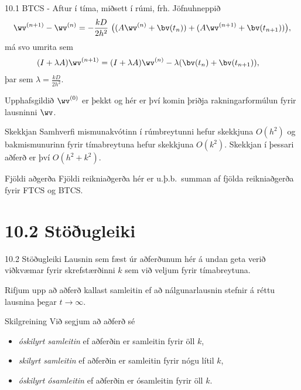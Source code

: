\begin{frame}{10.1 BTCS - Aftur í tíma, miðsett í rúmi, frh.}
 Jöfnuhneppið
 $$ 
 \wv^{(n+1)} - \wv^{(n)} =  -\frac{kD}{2h^2}\  
 \big( (A\wv^{(n)} + \bv(t_{n})) +  
 (A\wv^{(n+1)} + \bv(t_{n+1})) \big), 
$$
má svo umrita sem
\begin{align*}
 (I+\lambda A)\wv^{(n+1)} &= (I+\lambda A) \wv^{(n)}  - \lambda (\bv(t_{n}) 
 + \bv(t_{n+1})), 
\end{align*}
þar sem $\lambda = \frac{kD}{2h^2}$. \pause
 
 Upphafsgildið $\wv^{(0)}$ er þekkt og hér er því komin þriðja rakningarformúlun
 fyrir lausninni $\wv$.  \pause
 
 \begin{block}{Skekkjan}
  Samhverfi mismunakvótinn í rúmbreytunni hefur skekkjuna
 $O(h^2)$ og bakmismunurinn fyrir tímabreytuna hefur skekkjuna $O(k^2)$. 
 Skekkjan í þessari aðferð er því $O(h^2 + k^2)$.
 \end{block}
 
 \begin{block}{Fjöldi aðgerða}
  Fjöldi reikniaðgerða hér er u.þ.b.~summan af fjölda reikniaðgerða fyrir FTCS og BTCS.
 \end{block}

 
 \end{frame}
 
 \section*{10.2 Stöðugleiki}
 
 \begin{frame}{10.2 Stöðugleiki}
  Lausnin sem fæst úr aðferðunum hér á undan geta verið viðkvæmar fyrir skrefstærðinni $k$  sem við 
  veljum fyrir tímabreytuna. \pause
  
  
  Rifjum upp að aðferð kallast samleitin ef að nálgunarlausnin stefnir á 
  réttu lausnina þegar $t\to \infty$.
  
  \pause
  \begin{block}{Skilgreining}
    Við segjum að aðferð sé
    \begin{itemize}
     \item \emph{óskilyrt samleitin} ef aðferðin er samleitin fyrir öll $k$, \pause
     \item \emph{skilyrt samleitin} ef aðferðin er samleitin fyrir nógu lítil $k$,\pause
     \item \emph{óskilyrt ósamleitin} ef aðferðin er ósamleitin fyrir öll $k$.
    \end{itemize}

  \end{block}

 \end{frame}
 
